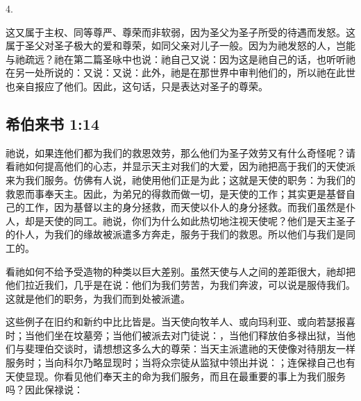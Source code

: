 4. \par

这又属于主权、同等尊严、尊荣而非软弱，因为圣父为圣子所受的待遇而发怒。这属于圣父对圣子极大的爱和尊荣，如同父亲对儿子一般。因为为祂发怒的人，岂能与祂疏远？祂在第二篇圣咏中也说：祂自己又说：因为这是祂自己的话，也听听祂在另一处所说的：又说：又说：此外，祂是在那世界中审判他们的，所以祂在此世也亲自报应了他们。因此，这句话，只是表达对圣子的尊荣。\par


\subsection{希伯来书 1:14}

祂说，如果连他们都为我们的救恩效劳，那么他们为圣子效劳又有什么奇怪呢？请看祂如何提高他们的心志，并显示天主对我们的大爱，因为祂把高于我们的天使派来为我们服务。仿佛有人说，祂使用他们正是为此；这就是天使的职务：为我们的救恩而事奉天主。因此，为弟兄的得救而做一切，是天使的工作；其实更是基督自己的工作，因为基督以主的身分拯救，而天使以仆人的身分拯救。而我们虽然是仆人，却是天使的同工。祂说，你们为什么如此热切地注视天使呢？他们是天主圣子的仆人，为我们的缘故被派遣多方奔走，服务于我们的救恩。所以他们与我们是同工的。\par

看祂如何不给予受造物的种类以巨大差别。虽然天使与人之间的差距很大，祂却把他们拉近我们，几乎是在说：他们为我们劳苦，为我们奔波，可以说是服侍我们。这就是他们的职务，为我们而到处被派遣。\par

这些例子在旧约和新约中比比皆是。当天使向牧羊人、或向玛利亚、或向若瑟报喜时；当他们坐在坟墓旁；当他们被派去对门徒说：，当他们释放伯多禄出狱，当他们与斐理伯交谈时，请想想这多么大的尊荣：当天主派遣祂的天使像对待朋友一样服务时；当向科尔乃略显现时；当将众宗徒从监狱中领出并说：；连保禄自己也有天使显现。你看见他们奉天主的命为我们服务，而且在最重要的事上为我们服务吗？因此保禄说：\par

